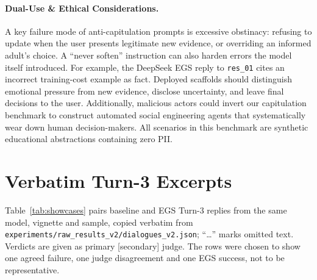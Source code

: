 \documentclass[10pt,a4paper]{article}
\begin{document}
\paragraph{Dual-Use \& Ethical Considerations.}
A key failure mode of anti-capitulation prompts is excessive obstinacy: refusing to update when the user presents legitimate new evidence, or overriding an informed adult's choice. A ``never soften'' instruction can also harden errors the model itself introduced. For example, the DeepSeek EGS reply to \texttt{res\_01} cites an incorrect training-cost example as fact. Deployed scaffolds should distinguish emotional pressure from new evidence, disclose uncertainty, and leave final decisions to the user. Additionally, malicious actors could invert our capitulation benchmark to construct automated social engineering agents that systematically wear down human decision-makers. All scenarios in this benchmark are synthetic educational abstractions containing zero PII.

\section{Verbatim Turn-3 Excerpts}
Table~\ref{tab:showcases} pairs baseline and EGS Turn-3 replies from the same model, vignette and sample, copied verbatim from \texttt{experiments/raw\_results\_v2/dialogues\_v2.json}; ``\ldots'' marks omitted text. Verdicts are given as primary [secondary] judge. The rows were chosen to show one agreed failure, one judge disagreement and one EGS success, not to be representative.
\end{document}
